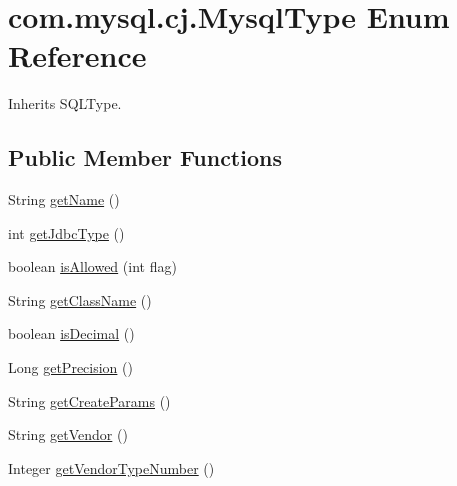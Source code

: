 \hypertarget{enumcom_1_1mysql_1_1cj_1_1_mysql_type}{}\section{com.\+mysql.\+cj.\+Mysql\+Type Enum Reference}
\label{enumcom_1_1mysql_1_1cj_1_1_mysql_type}


Inherits S\+Q\+L\+Type.

\subsection*{Public Member Functions}
\begin{DoxyCompactItemize}
\item 
String \mbox{\hyperlink{enumcom_1_1mysql_1_1cj_1_1_mysql_type_a24a135e97525c118f3cdd32cbe3cda08}{get\+Name}} ()
\item 
int \mbox{\hyperlink{enumcom_1_1mysql_1_1cj_1_1_mysql_type_ae737f5bd1ab16d3ec8cd7828128aa274}{get\+Jdbc\+Type}} ()
\item 
boolean \mbox{\hyperlink{enumcom_1_1mysql_1_1cj_1_1_mysql_type_a1f97918428df4d6060c28e9b7600ba4b}{is\+Allowed}} (int flag)
\item 
String \mbox{\hyperlink{enumcom_1_1mysql_1_1cj_1_1_mysql_type_aece90c449e68bd8c428889b5d01864ac}{get\+Class\+Name}} ()
\item 
boolean \mbox{\hyperlink{enumcom_1_1mysql_1_1cj_1_1_mysql_type_a212a8ea526160a1c989bc45f00946131}{is\+Decimal}} ()
\item 
Long \mbox{\hyperlink{enumcom_1_1mysql_1_1cj_1_1_mysql_type_ab636a1d0c77d0dc3e7daf32889cc2abe}{get\+Precision}} ()
\item 
String \mbox{\hyperlink{enumcom_1_1mysql_1_1cj_1_1_mysql_type_a8a7d74c445dd27bb413e8588cdf2eae7}{get\+Create\+Params}} ()
\item 
String \mbox{\hyperlink{enumcom_1_1mysql_1_1cj_1_1_mysql_type_aaa1bf1c44644ef088c4808905764350e}{get\+Vendor}} ()
\item 
Integer \mbox{\hyperlink{enumcom_1_1mysql_1_1cj_1_1_mysql_type_a71eb160870bf8c9e399f829a2274427d}{get\+Vendor\+Type\+Number}} ()
\end{DoxyCompactItemize}
